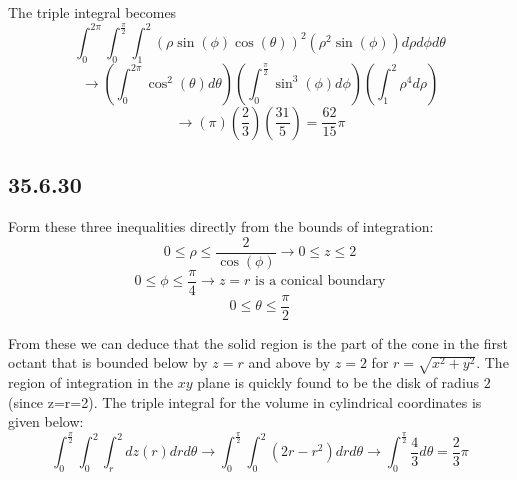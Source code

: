 \documentclass{article}
\begin{document}
The triple integral becomes $$\int_{0}^{2\pi}\int_{0}^{\frac{\pi}{2}}\int_{1}^{2}\left(\rho\sin(\phi)\cos(\theta)\right)^2\left(\rho^2\sin(\phi)\right)d\rho d\phi d\theta$$
$$\to \left(\int_{0}^{2\pi} \cos^2(\theta) d\theta \right)\left(\int_{0}^{\frac{\pi}{2}} \sin^3(\phi) d\phi \right)\left(\int_{1}^{2} \rho^4 d\rho \right)$$
$$\to (\pi)\left(\frac{2}{3}\right)\left(\frac{31}{5}\right) = \frac{62}{15}\pi$$

\subsection{35.6.30}

Form these three inequalities directly from the bounds of integration:
$$0 \leq \rho \leq \frac{2}{\cos(\phi)}\to 0\leq z \leq 2$$
$$0 \leq \phi \leq \frac{\pi}{4} \to z = r \text{ is a conical boundary}$$
$$0 \leq \theta \leq \frac{\pi}{2}$$

From these we can deduce that the solid region is the part of the cone in the first octant that is bounded below by $z=r$ and above by $z=2$ for $r = \sqrt{x^2+ y^2}$. The region of integration in the $xy$ plane is quickly found to be the disk of radius $2$ (since z=r=2). The triple integral for the volume in cylindrical coordinates is given below:
$$\int_{0}^{\frac{\pi}{2}}\int_{0}^{2}\int_{r}^{2}dz(r)drd\theta \to \int_{0}^{\frac{\pi}{2}}\int_{0}^{2} (2r-r^2)drd\theta \to \int_{0}^{\frac{\pi}{2}} \frac{4}{3}d\theta = \frac{2}{3}\pi$$
\end{document}
